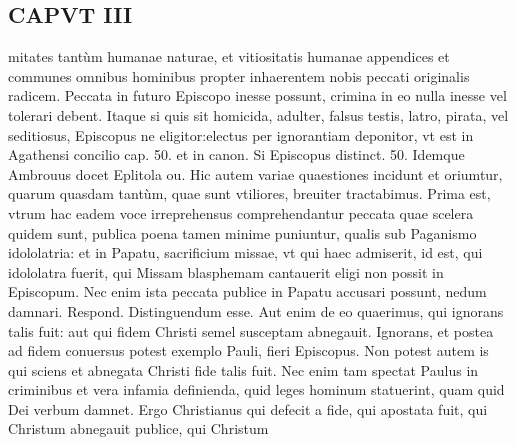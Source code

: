 \documentclass{article}
\begin{document}
\begin{pages}
\section*{CAPVT  III }
\marginpar{[ p.103 ]}\pstart mitates tantùm humanae naturae, et vitiositatis humanae appendices et communes omnibus hominibus propter inhaerentem nobis peccati originalis radicem. Peccata in futuro Episcopo inesse possunt, crimina in eo nulla inesse vel tolerari debent. Itaque si quis sit homicida, adulter, falsus testis, latro, pirata, vel seditiosus, Episcopus ne eligitor:electus per ignorantiam deponitor, vt est in Agathensi concilio cap. 50. et in canon. Si Episcopus distinct. 50. Idemque Ambrouus docet Eplitola ou.  \pend\pstart Hic autem variae quaestiones incidunt et oriumtur, quarum quasdam tantùm, quae sunt vtiliores, breuiter tractabimus.  \pend\pstart Prima est, vtrum hac eadem voce irreprehensus comprehendantur peccata quae scelera quidem sunt, publica poena tamen minime puniuntur, qualis sub Paganismo idololatria: et in Papatu, sacrificium missae, vt qui haec admiserit, id est, qui idololatra fuerit, qui Missam blasphemam cantauerit eligi non possit in Episcopum. Nec enim ista peccata publice in Papatu accusari possunt, nedum damnari. Respond. Distinguendum esse. Aut enim de eo quaerimus, qui ignorans talis fuit: aut qui fidem Christi semel susceptam abnegauit. Ignorans, et postea ad fidem conuersus potest exemplo Pauli, fieri Episcopus. Non potest autem is qui sciens et abnegata Christi fide talis fuit. Nec enim tam spectat Paulus in criminibus et vera infamia definienda, quid leges hominum statuerint, quam quid Dei verbum damnet. Ergo Christianus qui defecit a fide, qui apostata fuit, qui Christum abnegauit publice, qui Christum  \pend

\end{pages}
\end{document}
